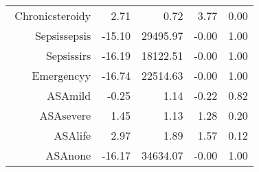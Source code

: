 \begin{tabular}{rrrrr}
$$  Chronic\-steroid\-y & 2.71 & 0.72 & 3.77 & 0.00 \\ 
  Sepsis\-sepsis & -15.10 & 29495.97 & -0.00 & 1.00 \\ 
  Sepsis\-sirs & -16.19 & 18122.51 & -0.00 & 1.00 \\ 
  Emergency\-y & -16.74 & 22514.63 & -0.00 & 1.00 \\ 
  ASA\-mild & -0.25 & 1.14 & -0.22 & 0.82 \\ 
  ASA\-severe & 1.45 & 1.13 & 1.28 & 0.20 \\ 
  ASA\-life & 2.97 & 1.89 & 1.57 & 0.12 \\ 
  ASA\-none & -16.17 & 34634.07 & -0.00 & 1.00 \\ 
   \hline
\end{tabular}

